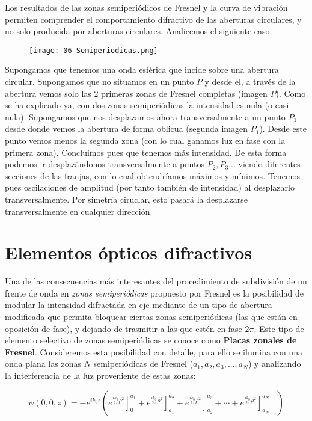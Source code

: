 \documentclass[12pt,a4paper]{book}
\numberwithin{equation}{section}
\numberwithin{figure}{section}
\newcommand{\parentesis}[1]{\left( #1  \right)}
\newcommand{\1}{_{(1)}}
\newcommand{\2}{_{(2)}}
\theoremstyle{definition}
\begin{document}
Los resultados de las zonas semiperiódicos de Fresnel y la curva de vibración permiten comprender el comportamiento difractivo de las aberturas circulares, y no solo producida por aberturas circulares. Analicemos el siguiente caso:


\begin{figure}[h!]
    \centering
    \texttt{[image: 06-Semiperiodicas.png]}
    \label{Fig:06.2-03}
    \caption{}
\end{figure}

Supongamos que tenemos una onda esférica que incide sobre una abertura circular. Supongamos que no situamos en un punto $P$ y desde el, a través de la abertura vemos solo las 2 primeras zonas de Fresnel completas (imagen $P$). Como se ha explicado ya, con dos zonas semiperiódicas la intensidad es nula (o casi nula). Supongamos que nos desplazamos ahora transversalmente a un punto $P_1$ desde donde vemos la abertura de forma oblicua (segunda imagen $P_1$). Desde este punto vemos menos la segunda zona (con lo cual ganamos luz en fase con la primera zona). Concluimos pues que tenemos más intensidad. De esta forma podemos ir desplazándonos transversalmente a puntos $P_2,P_3$... viendo diferentes secciones de las franjas, con lo cual obtendríamos máximos y mínimos. Tenemos pues oscilaciones de amplitud (por tanto también de intensidad) al desplazarlo transversalmente. Por simetría ciruclar, esto pasará la desplazarse transversalmente en cualquier dirección. 



\section{Elementos ópticos difractivos}

Una de las consecuencias más interesantes del procedimiento de subdivisión de un frente de onda en \textit{zonas semiperiódicas} propuesto por Fresnel es la posibilidad de modular la intensidad difractada en eje mediante de un tipo de abertura modificada que permita bloquear ciertas zonas semiperiódicas (las que están en oposición de fase), y dejando de trasmitir a las que estén en fase $2\pi$. Este tipo de elemento selectivo de zonas semiperiódicas se conoce como \textbf{Placas zonales de Fresnel}. Consideremos esta posibilidad con detalle, para ello se ilumina con una onda plana las zonas $N$ semiperiódicas de Fresnel ($a_1,a_2,a_3,...,a_N$) y analizando la interferencia de la luz proveniente de estas zonas: 

\begin{equation}
    \psi (0,0,z) = - e^{ik_0z} \parentesis{\left. e^{\frac{ik_0}{2z}\rho^2} \right]_{0}^{a_1} + \left. e^{\frac{ik_0}{2z}\rho^2} \right]_{a_1}^{a_2} +
    \left. e^{\frac{ik_0}{2z}\rho^2} \right]_{a_2}^{a_3} + \cdots + \left. e^{\frac{ik_0}{2z}\rho^2} \right]_{a_{N-1}}^{a_N}  }
\end{equation}
\end{document}
